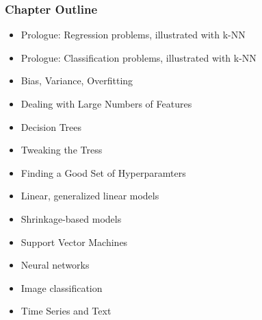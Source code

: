 \documentclass{beamer}
\begin{document}
\begin{frame} 
\frametitle{Chapter Outline}
\pause

\begin{itemize}

\item Prologue: Regression problems, illustrated with k-NN

\item Prologue: Classification problems, illustrated with k-NN

\item Bias, Variance, Overfitting

\item Dealing with Large Numbers of Features

\item Decision Trees

\item Tweaking the Tress

\item Finding a Good Set of Hyperparamters

\item Linear, generalized linear models

\item Shrinkage-based models

\item Support Vector Machines

\item Neural networks

\item Image classification

\item Time Series and Text

\end{itemize} 

\end{frame} 
\end{document}
